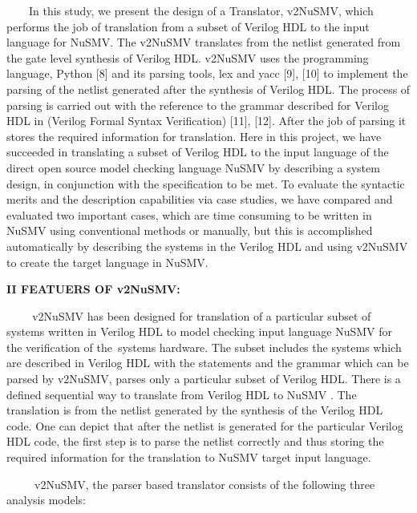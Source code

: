 \documentclass[a4paper]{article}
\begin{document}
{\color[rgb]{0.0,0.0,0.039215688}
\textrm{\ \ }\textrm{\ \ In this study, we present the design of a
Translator, v2NuSMV, which performs the job of translation from a
subset of Verilog HDL to the input language for NuSMV. The v2NuSMV
translates from the netlist generated from the gate level synthesis of
Verilog HDL. v2NuSMV uses the programming language, Python [8] and its
parsing tools, lex and yacc [9], [10] to implement the parsing of the
netlist generated after the synthesis of Verilog HDL. The process of
parsing is carried out with the reference to the grammar described for
Verilog HDL in (Verilog Formal Syntax Verification) [11], [12]. After
the job of parsing it stores the required information for translation.
Here in this project, we have succeeded in translating a subset of
Verilog HDL to the input language of the direct open source model
checking language NuSMV by describing a system design, in conjunction
with the specification to be met. To evaluate the syntactic merits and
the description capabilities via case studies, we have compared and
evaluated two important cases, which are time consuming to be written
in NuSMV using conventional methods or manually, but this is
accomplished automatically by describing the systems in the Verilog HDL
and using v2NuSMV to create the target language in NuSMV.\ }}

{\rmfamily\bfseries\color[rgb]{0.0,0.0,0.039215688}
II FEATUERS OF v2NuSMV:}

{\color[rgb]{0.0,0.0,0.039215688}
\textrm{\textbf{\ \ }}\textrm{\textbf{\ \ }}\textrm{v2NuSMV has been
designed for translation of a particular subset of systems written in
Verilog HDL to model checking input language NuSMV for the verification
of the\ }\textrm{system{\textquotesingle}s hardware. The subset
includes the systems which are described in Verilog HDL with the
statements and the grammar which can be parsed by v2NuSMV, parses only
a particular subset of Verilog HDL. There is a defined sequential way
to translate from Verilog HDL to NuSMV . The translation is from the
netlist generated by the synthesis of the Verilog HDL code. One can
depict that after the netlist is generated for the particular Verilog
HDL code, the first step is to parse the netlist correctly and thus
storing the required information for the translation to NuSMV target
input language.}\textrm{\ }}

{\color[rgb]{0.0,0.0,0.039215688}
\textrm{\ \ }\textrm{\ \ \ v2NuSMV, the parser based translator consists
of the following three analysis models:\ }}
\end{document}
